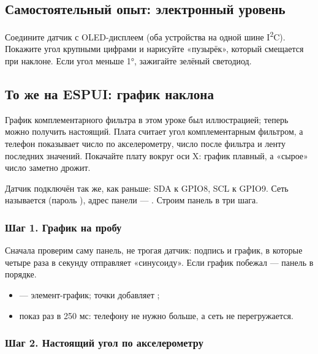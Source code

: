 \subsection{Самостоятельный опыт: электронный уровень}

Соедините датчик с OLED-дисплеем (оба устройства на одной шине I\textsuperscript{2}C). Покажите угол
крупными цифрами и нарисуйте «пузырёк», который смещается при наклоне. Если угол меньше 1°, зажигайте
зелёный светодиод.

\subsection{То же на ESPUI: график наклона}

График комплементарного фильтра в этом уроке был иллюстрацией; теперь
можно получить настоящий. Плата считает угол комплементарным фильтром, а телефон показывает
число по акселерометру, число после фильтра и ленту последних значений. Покачайте плату вокруг оси X:
график плавный, а «сырое» число заметно дрожит.

Датчик подключён так же, как раньше: SDA к GPIO8, SCL к GPIO9. Сеть называется 
(пароль ), адрес панели --- . Строим панель в три шага.

\subsubsection{Шаг 1. График на пробу}

Сначала проверим саму панель, не трогая датчик: подпись и график, в которые  четыре раза
в секунду отправляет «синусоиду». Если график побежал --- панель в порядке.


\begin{itemize}[leftmargin=*]
  \item {} --- элемент-график; точки добавляет ;
  \item показ раз в 250 мс: телефону не нужно больше, а сеть не перегружается.
\end{itemize}

\subsubsection{Шаг 2. Настоящий угол по акселерометру}

